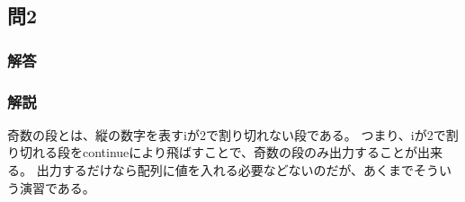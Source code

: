 \subsection{問2}
\subsubsection{解答}

\subsubsection{解説}
奇数の段とは、縦の数字を表すiが2で割り切れない段である。
つまり、iが2で割り切れる段をcontinueにより飛ばすことで、奇数の段のみ出力することが出来る。
出力するだけなら配列に値を入れる必要などないのだが、あくまでそういう演習である。

